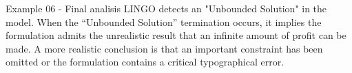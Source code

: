 \begin{frame}{Example 06 - Final analisis}
LINGO detects an "Unbounded Solution" in the model.
When the “Unbounded Solution” termination occurs, it implies the formulation
admits the unrealistic result  that an infinite amount of profit can be made. A more
realistic conclusion is that an important  constraint has been omitted or the
formulation contains a critical typographical error.
\end{frame}
